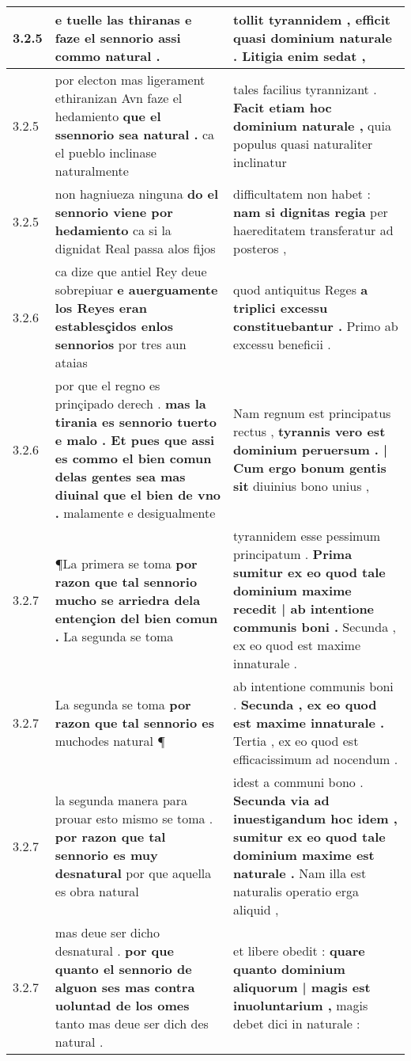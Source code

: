 \begin{tabular}{|p{1cm}|p{6.5cm}|p{6.5cm}|}
3.2.5 & e tuelle las thiranas \textbf{ e faze el sennorio } assi commo natural . & tollit tyrannidem , \textbf{ efficit quasi dominium naturale . } Litigia enim sedat , \\\hline
3.2.5 & por electon mas ligerament ethiranizan Avn faze el hedamiento \textbf{ que el ssennorio sea natural . } ca el pueblo inclinase naturalmente & tales facilius tyrannizant . \textbf{ Facit etiam hoc dominium naturale , } quia populus quasi naturaliter inclinatur \\\hline
3.2.5 & non hagniueza ninguna \textbf{ do el sennorio viene por hedamiento } ca si la dignidat Real passa alos fijos & difficultatem non habet : \textbf{ nam si dignitas regia } per haereditatem transferatur ad posteros , \\\hline
3.2.6 & ca dize que antiel Rey deue sobrepiuar \textbf{ e auerguamente los Reyes eran establesçidos enlos sennorios } por tres aun ataias & quod antiquitus Reges \textbf{ a triplici excessu constituebantur . } Primo ab excessu beneficii . \\\hline
3.2.6 & por que el regno es prinçipado derech . \textbf{ mas la tirania es sennorio tuerto e malo . Et pues que assi es commo el bien comun delas gentes sea mas diuinal que el bien de vno . } malamente e desigualmente & Nam regnum est principatus rectus , \textbf{ tyrannis vero est dominium peruersum . | Cum ergo bonum gentis sit } diuinius bono unius , \\\hline
3.2.7 & ¶La primera se toma \textbf{ por razon que tal sennorio mucho se arriedra dela entençion del bien comun . } La segunda se toma & tyrannidem esse pessimum principatum . \textbf{ Prima sumitur ex eo quod tale dominium maxime recedit | ab intentione communis boni . } Secunda , ex eo quod est maxime innaturale . \\\hline
3.2.7 & La segunda se toma \textbf{ por razon que tal sennorio es } muchodes natural ¶ & ab intentione communis boni . \textbf{ Secunda , ex eo quod est maxime innaturale . } Tertia , ex eo quod est efficacissimum ad nocendum . \\\hline
3.2.7 & la segunda manera para prouar esto mismo se toma . \textbf{ por razon que tal sennorio es muy desnatural } por que aquella es obra natural & idest a communi bono . \textbf{ Secunda via ad inuestigandum hoc idem , sumitur ex eo quod tale dominium maxime est naturale . } Nam illa est naturalis operatio erga aliquid , \\\hline
3.2.7 & mas deue ser dicho desnatural . \textbf{ por que quanto el sennorio de alguon ses mas contra uoluntad de los omes } tanto mas deue ser dich des natural . & et libere obedit : \textbf{ quare quanto dominium aliquorum | magis est inuoluntarium , } magis debet dici in naturale : \\\hline

\end{tabular}
